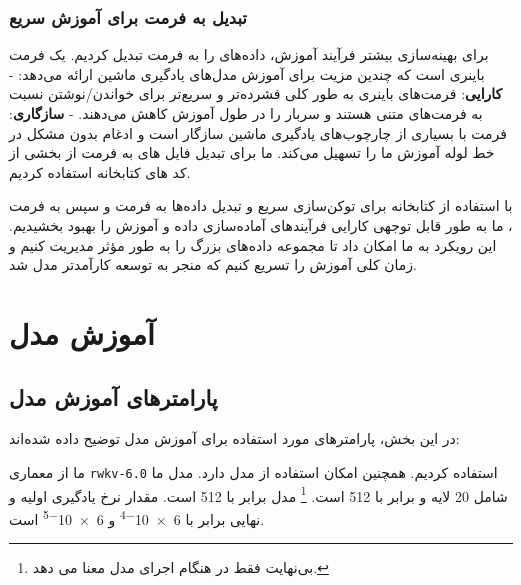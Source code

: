 \subsubsection{تبدیل به فرمت  برای آموزش سریع}

برای بهینه‌سازی بیشتر فرآیند آموزش، داده‌های  را به فرمت  تبدیل
کردیم.  یک فرمت باینری است که چندین مزیت برای آموزش مدل‌های یادگیری
ماشین ارائه می‌دهد: - \textbf{کارایی}: فرمت‌های باینری به طور کلی فشرده‌تر
و سریع‌تر برای خواندن/نوشتن نسبت به فرمت‌های متنی هستند و سربار  را در
طول آموزش کاهش می‌دهند. - \textbf{سازگاری}: فرمت  با بسیاری از
چارچوب‌های یادگیری ماشین سازگار است و ادغام بدون مشکل در خط لوله آموزش ما
را تسهیل می‌کند. ما برای تبدیل فایل های  به فرمت  از بخشی از کد های کتابخانه  \cite{gpt-neox-library} استفاده کردیم.

با استفاده از کتابخانه  برای توکن‌سازی سریع و تبدیل داده‌ها به
فرمت  و سپس به فرمت ، ما به طور قابل توجهی کارایی فرآیندهای
آماده‌سازی داده و آموزش را بهبود بخشیدیم. این رویکرد به ما امکان داد تا
مجموعه داده‌های بزرگ را به طور مؤثر مدیریت کنیم و زمان کلی آموزش را تسریع
کنیم که منجر به توسعه کارآمدتر مدل شد.

\section{آموزش مدل}
\subsection{پارامترهای آموزش مدل}
در این بخش، پارامترهای مورد استفاده برای آموزش مدل توضیح داده شده‌اند:

ما از معماری \texttt{rwkv-6.0} \cite{peng2024eagle} استفاده کردیم. همچنین
امکان استفاده از مدل دارد. مدل ما شامل 20 لایه و
 برابر با 512 است.  \footnote{ بی‌نهایت فقط در هنگام اجرای مدل معنا می  دهد.} مدل برابر با
512 است.
مقدار نرخ یادگیری اولیه و نهایی برابر با \num{6e-4}   و \num{6e-5} است.

